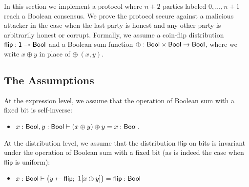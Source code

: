\renewcommand{\flip}{\mathsf{flip}}
\renewcommand{\id}{\mathsf{id}}
\renewcommand{\adv}{\mathsf{adv}}
\newcommand{\party}{\mathsf{party}}
\newcommand{\comm}{\mathsf{comm}}
\renewcommand{\Flip}{\mathsf{Flip}}
\newcommand{\Commit}{\mathsf{Commit}}
\newcommand{\Committed}{\mathsf{Committed}}
\newcommand{\Open}{\mathsf{Open}}
\newcommand{\Opened}{\mathsf{Opened}}
\newcommand{\SumCommit}{\mathsf{SumCommit}}
\newcommand{\AllCommitted}{\mathsf{AllCommitted}}
\newcommand{\AllOpen}{\mathsf{AllOpen}}
\newcommand{\SumOpened}{\mathsf{SumOpened}}
\renewcommand{\Out}{\mathsf{Out}}
\newcommand{\LastCommit}{\mathsf{LastCommit}}
\renewcommand{\LeakFlip}{\mathsf{LeakFlip}}
\newcommand{\Ok}{\mathsf{Ok}}
\newcommand{\AdvCommit}{\mathsf{AdvCommit}}
\newcommand{\LeakCommitted}{\mathsf{LeakCommitted}}
\newcommand{\AdvOpen}{\mathsf{AdvOpen}}
\newcommand{\LeakOpened}{\mathsf{LeakOpened}}

In this section we implement a protocol where $n+2$ parties labeled $0,\ldots,n+1$ reach a Boolean consensus. We prove the protocol secure against a malicious attacker in the case when the last party is honest and any other party is arbitrarily honest or corrupt. Formally, we assume a coin-flip distribution $\flip : \one \twoheadrightarrow \Bool$ and a Boolean sum function $\oplus : \mathsf{Bool} \times \mathsf{Bool} \rightarrow \mathsf{Bool}$, where we write $x \oplus y$ in place of $\oplus \ (x,y)$.

\subsection{The Assumptions}
At the expression level, we assume that the operation of Boolean sum with a fixed bit is self-inverse:
\begin{itemize}
\item $x : \mathsf{Bool}, y : \mathsf{Bool} \vdash (x \oplus y) \oplus y = x : \mathsf{Bool}$.
\end{itemize}
At the distribution level, we assume that the distribution $\flip$ on bits is invariant under the operation of Boolean sum with a fixed bit (as is indeed the case when $\flip$ is uniform):
\begin{itemize}
\item $x : \Bool \vdash \big(y \leftarrow \flip; \ 1[x \oplus y]\big) = \flip : \Bool$
\end{itemize}

